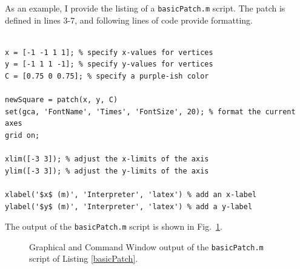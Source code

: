 As an example, I provide the listing of a \texttt{basicPatch.m} script. The patch is defined in lines 3-7, and following lines of code provide formatting.
\begin{lstlisting}[style=Matlab-editor,label=basicPatch,caption={Listing of the script \texttt{basicPatch.m}.}]
% basicPatch.m

x = [-1 -1 1 1]; % specify x-values for vertices
y = [-1 1 1 -1]; % specify y-values for vertices
C = [0.75 0 0.75]; % specify a purple-ish color

newSquare = patch(x, y, C)
set(gca, 'FontName', 'Times', 'FontSize', 20); % format the current axes
grid on;

xlim([-3 3]); % adjust the x-limits of the axis
ylim([-3 3]); % adjust the y-limits of the axis

xlabel('$x$ (m)', 'Interpreter', 'latex') % add an x-label
ylabel('$y$ (m)', 'Interpreter', 'latex') % add a y-label
\end{lstlisting}
The output of the \texttt{basicPatch.m} script is shown in Fig.\ \ref{fig:basicPatchOutput}.

\begin{figure}[htbp] %
   \centering
   \caption{Graphical and Command Window output of the \texttt{basicPatch.m} script of Listing \ref{basicPatch}.}
   \label{fig:basicPatchOutput}
\end{figure}

